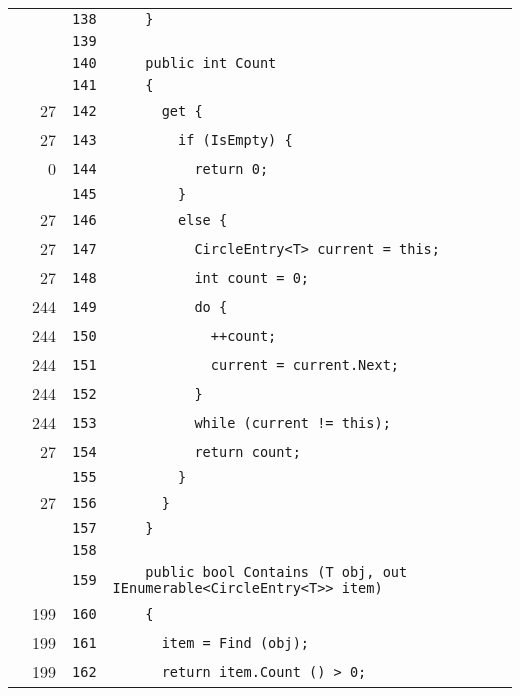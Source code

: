 \documentclass[a4paper,10pt]{article}
\begin{document}
\begin{longtable}[l]{lrrl}
\cellcolor{gray} &  & \verb~138~ & \verb~    }~\\
\cellcolor{gray} &  & \verb~139~ & \verb~~\\
\cellcolor{gray} &  & \verb~140~ & \verb~    public int Count~\\
\cellcolor{gray} &  & \verb~141~ & \verb~    {~\\
\cellcolor{green} & 27 & \verb~142~ & \verb~      get {~\\
\cellcolor{green} & 27 & \verb~143~ & \verb~        if (IsEmpty) {~\\
\cellcolor{red} & 0 & \verb~144~ & \verb~          return 0;~\\
\cellcolor{gray} &  & \verb~145~ & \verb~        }~\\
\cellcolor{green} & 27 & \verb~146~ & \verb~        else {~\\
\cellcolor{green} & 27 & \verb~147~ & \verb~          CircleEntry<T> current = this;~\\
\cellcolor{green} & 27 & \verb~148~ & \verb~          int count = 0;~\\
\cellcolor{green} & 244 & \verb~149~ & \verb~          do {~\\
\cellcolor{green} & 244 & \verb~150~ & \verb~            ++count;~\\
\cellcolor{green} & 244 & \verb~151~ & \verb~            current = current.Next;~\\
\cellcolor{green} & 244 & \verb~152~ & \verb~          }~\\
\cellcolor{green} & 244 & \verb~153~ & \verb~          while (current != this);~\\
\cellcolor{green} & 27 & \verb~154~ & \verb~          return count;~\\
\cellcolor{gray} &  & \verb~155~ & \verb~        }~\\
\cellcolor{green} & 27 & \verb~156~ & \verb~      }~\\
\cellcolor{gray} &  & \verb~157~ & \verb~    }~\\
\cellcolor{gray} &  & \verb~158~ & \verb~~\\
\cellcolor{gray} &  & \verb~159~ & \verb~    public bool Contains (T obj, out IEnumerable<CircleEntry<T>> item)~\\
\cellcolor{green} & 199 & \verb~160~ & \verb~    {~\\
\cellcolor{green} & 199 & \verb~161~ & \verb~      item = Find (obj);~\\
\cellcolor{green} & 199 & \verb~162~ & \verb~      return item.Count () > 0;~\\

\end{longtable}
\end{document}
